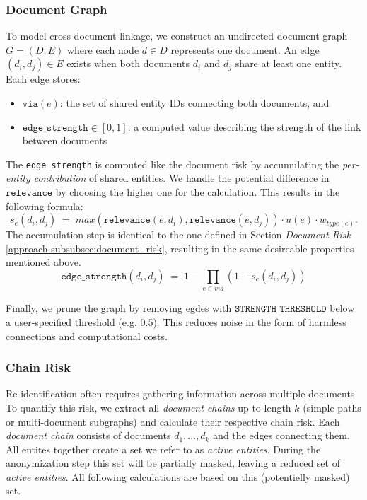 \subsubsection{Document Graph}
To model cross-document linkage, we construct an undirected document graph $G=(D,E)$ where each node $d\in D$ represents one document. An edge $(d_i,d_j)\in E$ exists when both documents $d_i$ and $d_j$ share at least one entity. Each edge stores:
\begin{itemize}
\item $\texttt{via}(e)$: the set of shared entity IDs connecting both documents, and 
\item $\texttt{edge\_strength}\in[0,1]$: a computed value describing the strength of the link between documents
\end{itemize}
The \texttt{edge\_strength} is computed like the document risk by accumulating the \textit{per-entity contribution} of shared entities. We handle the potential difference in $\texttt{relevance}$ by choosing the higher one for the calculation. This results in the following formula:
\[
s_e(d_i, d_j) \; =\; max(\texttt{relevance}(e,d_i), \texttt{relevance}(e,d_j)) \cdot u(e) \cdot w_{type(e)}.
\]
The accumulation step is identical to the one defined in Section \textit{Document Risk} \ref{approach-subsubsec:document_risk}, resulting in the same desireable properties mentioned above.
\[ 
\texttt{edge\_strength}(d_i,d_j) \;=\; 1 - \prod_{e\in{via}}(1 - s_e(d_i,d_j))
\]

Finally, we prune the graph by removing egdes with $\texttt{STRENGTH\_THRESHOLD}$ below a user-specified threshold (e.g. $0.5$). This reduces noise in the form of harmless connections and computational costs. 
\subsubsection{Chain Risk}\label{approach-subsubsec:chain_risk}
Re-identification often requires gathering information across multiple documents. To quantify this risk, we extract all \textit{document chains} up to length $k$ (simple paths or multi-document subgraphs) and calculate their respective chain risk. Each \textit{document chain} consists of documents $d_1,\dots,d_k$ and the edges connecting them. All entites together create a set we refer to as \textit{active entities}. During the anonymization step this set will be partially masked, leaving a reduced set of \textit{active entities}. All following calculations are based on this (potentielly masked) set.

